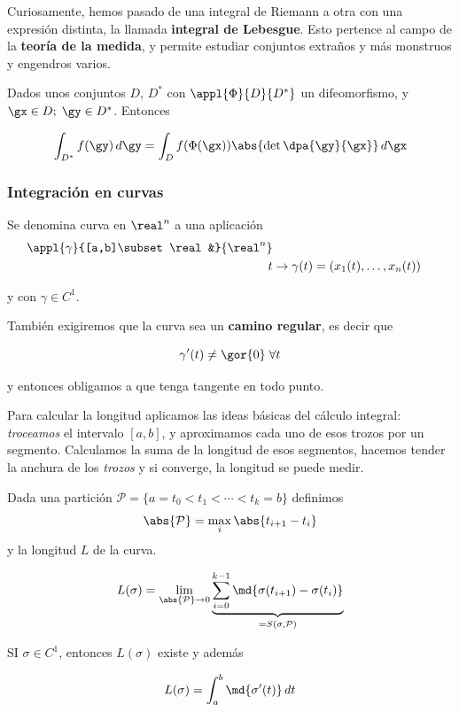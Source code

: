 Curiosamente, hemos pasado de una integral de Riemann a otra con una expresión distinta, la llamada \textbf{integral de Lebesgue}. Esto pertence al campo de la \textbf{teoría de la medida}, y permite estudiar conjuntos extraños y más monstruos y engendros varios.

\begin{theorem}
Dados unos conjuntos $D,\,D^\ast$ con $\appl{\Phi}{D}{D^\ast}$ un difeomorfismo, y $\gx \in D;\; \gy \in D^\ast$. Entonces

\[ \int_{D^\ast} f(\gy)\,d\gy = \int_D f(\Phi(\gx)) \abs{\det \dpa{\gy}{\gx}}\,d\gx \]
\end{theorem}

\subsubsection{Integración en curvas}

\begin{defn}[Curva\IS $C^1$]  Se denomina curva en $\real^n$ a una aplicación \begin{align*}
\appl{\gamma}{[a,b]\subset \real&}{\real^n} \\
t&\to \gamma(t) = (x_1(t),\dotsc,x_n(t))
\end{align*}

y con $\gamma\in C^1$.

También exigiremos que la curva sea un \textbf{camino regular}, es decir que

\[ \gamma'(t) \neq \gor{0} \;\forall t \]

y entonces obligamos a que tenga tangente en todo punto.
\end{defn}

Para calcular la longitud aplicamos las ideas básicas del cálculo integral: \textit{troceamos} el intervalo $[a,b]$, y aproximamos cada uno de esos trozos por un segmento. Calculamos la suma de la longitud de esos segmentos, hacemos tender la anchura de los \textit{trozos} y si converge, la longitud se puede medir.

\begin{theorem} Dada una partición $\mathcal{P} = \{ a= t_0 < t_1 < \dotsb < t_k = b\}$ definimos \[ \abs{\mathcal{P}} = \max_i \abs{t_{i+1} - t_i} \] y la longitud $L$ de la curva.

\[ L(\sigma) = \lim_{\abs{\mathcal{P}}\to 0} \underbrace{\sum_{i=0}^{k-1} \md{\sigma(t_{i+1}) - \sigma(t_i)}}_{=S(\sigma,\mathcal{P})} \]

SI $\sigma\in C^1$, entonces $L(\sigma)$ existe y además

\[ L(\sigma) = \int_a^b \md{\sigma'(t)}\,dt \]

\end{theorem}


